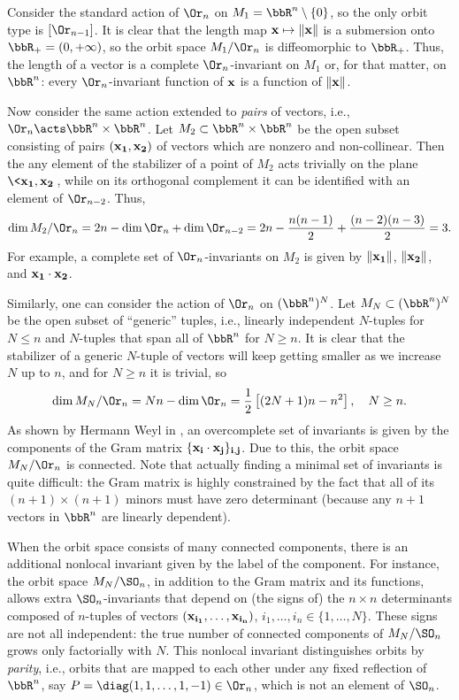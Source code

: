 \begin{example}
    Consider the standard action of $\Or_n$ on $M_1=\bbR^n\setminus\{0\}$, so the only orbit type is $[\Or_{n-1}]$. It is clear that the length map $\bf{x}\mapsto \lVert \bf{x}\rVert$ is a submersion onto $\bbR_+=(0,+\infty)$, so the orbit space $M_1\slash \Or_n$ is diffeomorphic to $\bbR_+$. Thus, the length of a vector is a complete $\Or_n$-invariant on $M_1$ or, for that matter, on $\bbR^n$: every $\Or_n$-invariant function of $\bf{x}$ is a function of $\lVert \bf{x}\rVert$.

    Now consider the same action extended to \emph{pairs} of vectors, i.e., $\Or_n\acts \bbR^n\times\bbR^n$. Let $M_2\subset \bbR^n\times\bbR^n$ be the open subset consisting of pairs $(\bf{x}_1,\bf{x}_2)$ of vectors which are nonzero and non-collinear. Then the any element of the stabilizer of a point of $M_2$ acts trivially on the plane $\<\bf{x}_1,\bf{x}_2\>$, while on its orthogonal complement it can be identified with an element of $\Or_{n-2}$. Thus,
    \[\dim M_2\slash \Or_n=2n-\dim \Or_n+\dim \Or_{n-2}=2n-\frac{n(n-1)}{2}+\frac{(n-2)(n-3)}{2}=3.\]
    For example, a complete set of $\Or_n$-invariants on $M_2$ is given by $\lVert \bf{x}_1\rVert$, $\lVert \bf{x}_2\rVert$, and $ \bf{x}_1\cdot\bf{x}_2$. 

    Similarly, one can consider the action of $\Or_n$ on $(\bbR^n)^N$. Let $M_N\subset (\bbR^n)^N$ be the open subset of ``generic'' tuples, i.e., linearly independent $N$-tuples for $N\leq n$ and $N$-tuples that span all of $\bbR^n$ for $N\geq n$. It is clear that the stabilizer of a generic $N$-tuple of vectors will keep getting smaller as we increase $N$ up to $n$, and for $N\geq n$ it is trivial, so 
    \[\dim M_N\slash \Or_n=Nn-\dim \Or_n=\frac12\left[(2N+1)n-n^2\right],\quad N\geq n.\]
    As shown by Hermann Weyl in \cite{Weyl}, an overcomplete set of invariants is given by the components of the Gram matrix $\{\bf{x}_i\cdot\bf{x}_j\}_{i,j}$. Due to this, the orbit space $M_N\slash \Or_n$ is connected. Note that actually finding a minimal set of invariants is quite difficult: the Gram matrix is highly constrained by the fact that all of its $(n+1)\times (n+1)$ minors must have zero determinant (because any $n+1$ vectors in $\bbR^n$ are linearly dependent). 

    When the orbit space consists of many connected components, there is an additional nonlocal invariant given by the label of the component. For instance, the orbit space $M_N\slash \SO_n$, in addition to the Gram matrix and its functions, allows extra $\SO_n$-invariants that depend on (the signs of) the $n\times n$ determinants composed of $n$-tuples of vectors $(\bf{x}_{i_1},\ldots,\bf{x}_{i_n})$, $i_1,\ldots,i_n\in \{1,\ldots,N\}$. These signs are not all independent: the true number of connected components of $M_N\slash \SO_n$ grows only factorially with $N$. This nonlocal invariant distinguishes orbits by \emph{parity}, i.e., orbits that are mapped to each other under any fixed reflection of $\bbR^n$, say $P=\diag(1,1,\ldots,1,-1)\in\Or_n$, which is not an element of $\SO_n$. 
    

\end{example}
